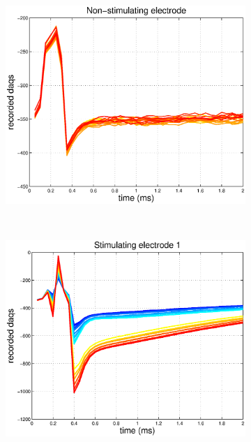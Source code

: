 \documentclass[12pt,letterpaper,fleqn]{article}
\begin{document}
\begin{figure}[ht!]
\begin{subfigure}[b]{0.32\textwidth}
                \includegraphics[width=\textwidth]{ArtTraceNS.eps}
                \caption{}
        \end{subfigure}
        \\
         \begin{subfigure}[b]{0.32\textwidth}
                \includegraphics[width=\textwidth]{ArtMeanS1.eps}
                \caption{}
        \end{subfigure}     
       ~ \begin{subfigure}[b]{0.32\textwidth}

\end{subfigure}
\end{figure}
\end{document}
